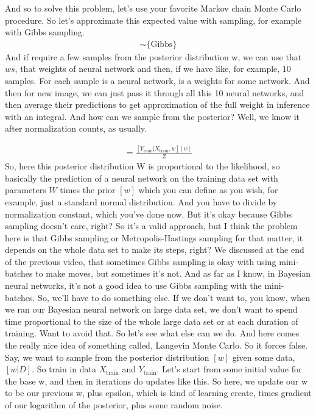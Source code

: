 \documentclass[11pt, oneside, reqno]{amsart}
\numberwithin{equation}{section}
\theoremstyle{plain}%
\theoremstyle{definition}
\theoremstyle{remark}
\begin{document}
 And so to solve this problem, let's use your favorite Markov chain Monte Carlo procedure. So let's approximate this expected value with sampling, for example with Gibbs sampling.
 \begin{align*} 	[w|Y_{\text{train}},X_{\text{train}}]\sim\{\text{Gibbs}\}
 \end{align*}
  And if require a few samples from the posterior distribution w, we can use that $ws$, that weights of neural network and then, if we have like, for example, $10$ samples. For each sample is a neural network, is a weights for some network. And then for new image, we can just pass it through all this 10 neural networks, and then average their predictions to get approximation of the full weight in inference with an integral. And how can we sample from the posterior? Well, we know it after normalization counts, as usually. 
  
  \begin{align*}
  	[w|Y_{\text{train}},X_{\text{train}}]=
	\frac{[Y_{\text{train}}|X_{\text{train}},w][w]}{Z}
  \end{align*}
So, here this posterior distribution W is proportional to the likelihood, so basically the prediction of a neural network on the training data set with parameters $W$ times the prior $[w]$ which you can define as you wish, for example, just a standard normal distribution. And you have to divide by normalization constant, which you've done now. But it's okay because Gibbs sampling doesn't care, right? So it's a valid approach, but I think the problem here is that Gibbs sampling or Metropolis-Hastings sampling for that matter, it depends on the whole data set to make its steps, right? We discussed at the end of the previous video, that sometimes Gibbs sampling is okay with using mini-batches to make moves, but sometimes it's not. And as far as I know, in Bayesian neural networks, it's not a good idea to use Gibbs sampling with the mini-batches. So, we'll have to do something else. If we don't want to, you know, when we ran our Bayesian neural network on large data set, we don't want to spend time proportional to the size of the whole large data set or at each duration of training. Want to avoid that. So let's see what else can we do. And here comes the really nice idea of something called, Langevin Monte Carlo. So it forces false. Say, we want to sample from the posterior distribution $[w]$ given some data, $[w|D]$. So train in data $X_\text{train}$ and $Y_\text{train}$. Let's start from some initial value for the base w, and then in iterations do updates like this. So here, we update our w to be our previous w, plus epsilon, which is kind of learning create, times gradient of our logarithm of the posterior, plus some random noise. 
\end{document}
